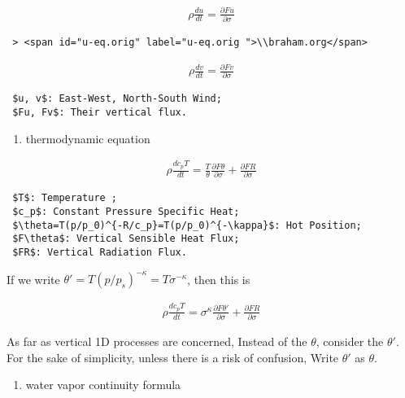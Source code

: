 \begin{eqnarray}
  \rho \frac{du}{dt} = \frac{\partial Fu}{\partial \sigma}
\end{eqnarray}

\begin{verbatim}
 > <span id="u-eq.orig" label="u-eq.orig ">\\braham.org</span>
\end{verbatim}

\begin{eqnarray}
  \rho \frac{dv}{dt} = \frac{\partial Fv}{\partial \sigma}
\end{eqnarray}

\begin{verbatim}
 $u, v$: East-West, North-South Wind;
 $Fu, Fv$: Their vertical flux.
\end{verbatim}

\begin{enumerate}
\def\labelenumi{\arabic{enumi}.}
\setcounter{enumi}{1}
\tightlist
\item
  thermodynamic equation
\end{enumerate}

\begin{eqnarray}
  \rho \frac{dc_p T}{dt} = \frac{T}{\theta} \frac{\partial F{\theta}}{\partial \sigma}
                     + \frac{\partial F{R}}{\partial \sigma}
\end{eqnarray}

\begin{verbatim}
 $T$: Temperature ;
 $c_p$: Constant Pressure Specific Heat;
 $\theta=T(p/p_0)^{-R/c_p}=T(p/p_0)^{-\kappa}$: Hot Position;
 $F\theta$: Vertical Sensible Heat Flux;
 $FR$: Vertical Radiation Flux.
\end{verbatim}

If we write \(\theta'=T(p/p_s)^{-\kappa}=T\sigma^{-\kappa}\), then this
is

\begin{eqnarray}
  \rho \frac{dc_p T}{dt} = \sigma^\kappa \frac{\partial F{\theta'}}{\partial \sigma}
                     + \frac{\partial F{R}}{\partial \sigma}
\end{eqnarray}

As far as vertical 1D processes are concerned, Instead of the
\(\theta\), consider the \(\theta'\). For the sake of simplicity, unless
there is a risk of confusion, Write \(\theta'\) as \(\theta\).

\begin{enumerate}
\def\labelenumi{\arabic{enumi}.}
\setcounter{enumi}{2}
\tightlist
\item
  water vapor continuity formula
\end{enumerate}

